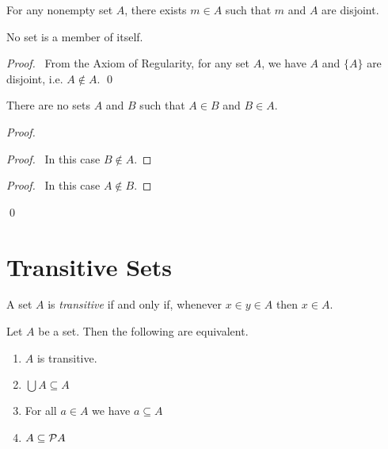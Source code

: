 \begin{axiom}[Regularity]
    For any nonempty set $A$, there exists $m \in A$ such that $m$ and $A$ are disjoint.
\end{axiom}

\begin{theorem}
    No set is a member of itself.
\end{theorem}

\begin{proof}
    \pf\ From the Axiom of Regularity, for any set $A$, we have $A$ and $\{A\}$
    are disjoint, i.e. $A \notin A$. \qed
\end{proof}

\begin{theorem}
    There are no sets $A$ and $B$ such that $A \in B$ and $B \in A$.
\end{theorem}

\begin{proof}
    \pf
    \begin{proof}
        \pf\ In this case $B \notin A$.
    \end{proof}
    \begin{proof}
        \pf\ In this case $A \notin B$.
    \end{proof}
    \qed
\end{proof}

\section{Transitive Sets}

\begin{definition}
    A set $A$ is \emph{transitive} if and only if, whenever $x \in y \in A$
    then $x \in A$.
\end{definition}

\begin{theorem}
    Let $A$ be a set. Then the following are equivalent.
    \begin{enumerate}
        \item $A$ is transitive.
        \item $\bigcup A \subseteq A$
        \item For all $a \in A$ we have $a \subseteq A$
        \item $A \subseteq \mathcal{P} A$
    \end{enumerate}
\end{theorem}

